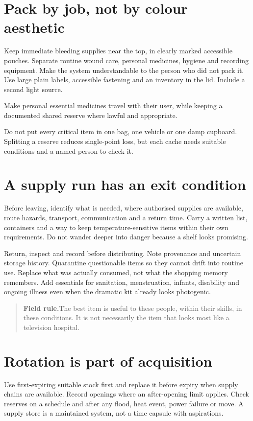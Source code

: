 \documentclass[10pt,openright]{book}
\newcommand{\fieldrule}[1]{\begin{quote}\textbf{Field rule.}\enspace #1\end{quote}}
\begin{document}
\section*{Pack by job, not by colour aesthetic}
Keep immediate bleeding supplies near the top, in clearly marked accessible pouches. Separate routine wound care, personal medicines, hygiene and recording equipment. Make the system understandable to the person who did not pack it. Use large plain labels, accessible fastening and an inventory in the lid. Include a second light source.

Make personal essential medicines travel with their user, while keeping a documented shared reserve where lawful and appropriate.

Do not put every critical item in one bag, one vehicle or one damp cupboard. Splitting a reserve reduces single-point loss, but each cache needs suitable conditions and a named person to check it.

\section*{A supply run has an exit condition}
Before leaving, identify what is needed, where authorised supplies are available, route hazards, transport, communication and a return time. Carry a written list, containers and a way to keep temperature-sensitive items within their own requirements. Do not wander deeper into danger because a shelf looks promising.

Return, inspect and record before distributing. Note provenance and uncertain storage history. Quarantine questionable items so they cannot drift into routine use. Replace what was actually consumed, not what the shopping memory remembers. Add essentials for sanitation, menstruation, infants, disability and ongoing illness even when the dramatic kit already looks photogenic.

\fieldrule{The best item is useful to these people, within their skills, in these conditions. It is not necessarily the item that looks most like a television hospital.}
\section*{Rotation is part of acquisition}
Use first-expiring suitable stock first and replace it before expiry when supply chains are available. Record openings where an after-opening limit applies. Check reserves on a schedule and after any flood, heat event, power failure or move. A supply store is a maintained system, not a time capsule with aspirations.
\end{document}
